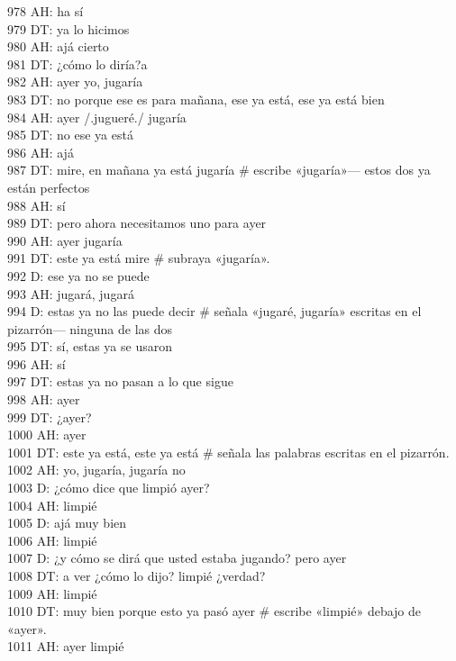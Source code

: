 978 AH: ha sí\\
979 DT: ya lo hicimos\\
980 AH: ajá cierto\\
981 DT: ¿cómo lo diría?a\\
982 AH: ayer yo, jugaría\\
983 DT: no porque ese es para mañana, ese ya está, ese ya está bien\\
984 AH: ayer /.jugueré./ jugaría\\
985 DT: no ese ya está\\
986 AH: ajá\\
987 DT: mire, en mañana ya está jugaría \# escribe «jugaría»--- estos dos ya están perfectos\\
988 AH: sí\\
989 DT: pero ahora necesitamos uno para ayer\\
990 AH: ayer jugaría\\
991 DT: este ya está mire \# subraya «jugaría».\\
992 D: ese ya no se puede\\
993 AH: jugará, jugará\\
994 D: estas ya no las puede decir \# señala «jugaré, jugaría» escritas en el pizarrón--- ninguna de las dos\\
995 DT: sí, estas ya se usaron\\
996 AH: sí\\
997 DT: estas ya no pasan a lo que sigue\\
998 AH: ayer\\
999 DT: ¿ayer?\\
1000 AH: ayer\\
1001 DT: este ya está, este ya está \# señala las palabras escritas en el pizarrón.\\
1002 AH: yo, jugaría, jugaría no\\
1003 D: ¿cómo dice que limpió ayer?\\
1004 AH: limpié\\
1005 D: ajá muy bien\\
1006 AH: limpié\\
1007 D: ¿y cómo se dirá que usted estaba jugando? pero ayer\\
1008 DT: a ver ¿cómo lo dijo? limpié ¿verdad?\\
1009 AH: limpié\\
1010 DT: muy bien porque esto ya pasó ayer \# escribe «limpié» debajo de «ayer».\\
1011 AH: ayer limpié\\
